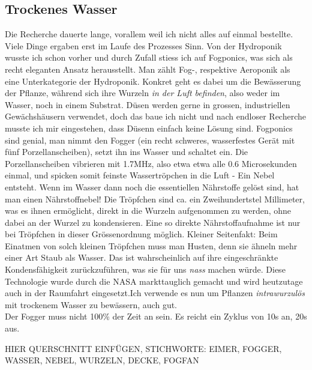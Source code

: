 \documentclass[12pt,titlepage,a4paper]{article}
\begin{document}
\subsection{Trockenes Wasser}
Die Recherche dauerte lange, vorallem weil ich nicht alles auf einmal bestellte. Viele Dinge ergaben erst im Laufe des Prozesses Sinn. Von der Hydroponik wusste ich schon vorher und durch Zufall stiess ich auf Fogponics, was sich als recht eleganten Ansatz herausstellt. Man zählt Fog-, respektive Aeroponik als eine Unterkategorie der Hydroponik. Konkret geht es dabei um die Bewässerung der Pflanze, während sich ihre Wurzeln \textit{in der Luft befinden}, also weder im Wasser, noch in einem Substrat. Düsen werden gerne in grossen, industriellen Gewächshäusern verwendet, doch das baue ich nicht und nach endloser Recherche musste ich mir eingestehen, dass Düsenn einfach keine Lösung sind. Fogponics sind genial, man nimmt den Fogger (ein recht schweres, wasserfestes Gerät mit fünf Porzellanscheiben), setzt ihn ins Wasser und schaltet ein. 
Die Porzellanscheiben vibrieren mit 1.7MHz, also etwa etwa alle 0.6 Microsekunden einmal, und spicken somit feinste Wassertröpchen in die Luft - Ein Nebel entsteht. Wenn im Wasser dann noch die essentiellen Nährstoffe gelöst sind, hat man einen Nährstoffnebel! Die Tröpfchen sind ca. ein Zweihundertstel Millimeter, was es ihnen ermöglicht, direkt in die Wurzeln aufgenommen zu werden, ohne dabei an der Wurzel zu kondensieren. Eine so direkte Nährstoffaufnahme ist nur bei Tröpfchen in dieser Grössenordnung möglich. 
Kleiner Seitenfakt: Beim Einatmen von solch kleinen Tröpfchen muss man Husten, denn sie ähneln mehr einer Art Staub als Wasser. Das ist wahrscheinlich auf ihre eingeschränkte Kondensfähigkeit zurückzuführen, was sie für uns \textit{nass} machen würde. Diese Technologie wurde durch die NASA markttauglich gemacht und wird heutzutage auch in der Raumfahrt eingesetzt.Ich verwende es nun um Pflanzen \textit{intrawurzulös} mit trockenem Wasser zu bewässern, auch gut. \\ Der Fogger muss nicht 100\% der Zeit an sein. Es reicht ein Zyklus von 10s an, 20s aus.

HIER QUERSCHNITT EINFÜGEN, STICHWORTE: EIMER, FOGGER, WASSER, NEBEL, WURZELN, DECKE, FOGFAN
\end{document}
